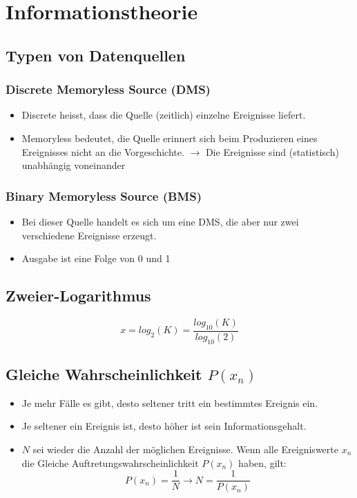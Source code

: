 \section{Informationstheorie}
\subsection{Typen von Datenquellen}
\subsubsection{Discrete Memoryless Source (DMS)}
\begin{itemize}
	\item Discrete heisst, dass die Quelle (zeitlich) einzelne Ereignisse liefert.
	\item Memoryless bedeutet, die Quelle erinnert sich beim Produzieren
	      eines Ereignisses nicht an die Vorgeschichte.
	      $\rightarrow$ Die Ereignisse sind (statistisch) unabhängig voneinander
\end{itemize}
\subsubsection{Binary Memoryless Source (BMS)}
\begin{itemize}
	\item Bei dieser Quelle handelt es sich um eine DMS, die aber nur zwei
	      verschiedene Ereignisse erzeugt.
	\item Ausgabe ist eine Folge von 0 und 1
\end{itemize}
\subsection{Zweier-Logarithmus}
\begin{equation*}
	x = log_2(K) = \frac{log_{10}(K)}{log_{10}(2)}
\end{equation*}
\subsection{Gleiche Wahrscheinlichkeit $P(x_n)$}
\begin{itemize}
	\item Je mehr Fälle es gibt, desto seltener tritt ein bestimmtes Ereignis ein.
	\item Je seltener ein Ereignis ist, desto höher ist sein Informationsgehalt.
	\item $N$ sei wieder die Anzahl der möglichen Ereignisse. Wenn alle Ereigniswerte $x_n$ die Gleiche
	      Auftretungswahrscheinlichkeit $P(x_n)$ haben, gilt:
	      \begin{equation*}
		      P(x_n) = \frac{1}{N} \rightarrow N = \frac{1}{P(x_n)}
	      \end{equation*}
\end{itemize}
